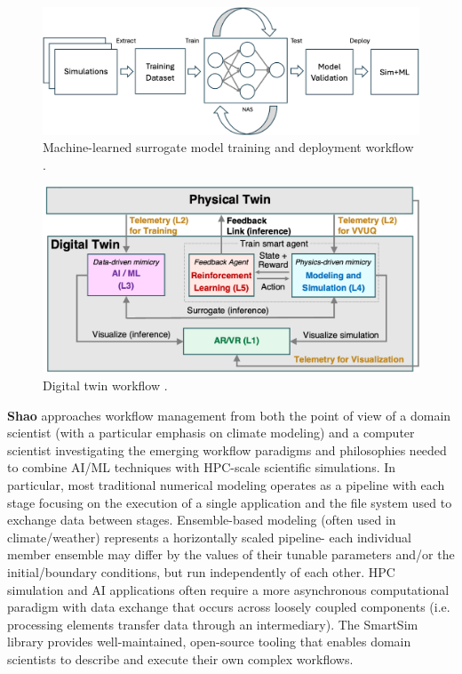 \documentclass[utf8]{FrontiersinVancouver} %
\begin{document}
\begin{figure}
    \centering
    \includegraphics[width=0.8\linewidth]{images/workflow-surrogate-model.png}
    \caption{Machine-learned surrogate model training and deployment workflow \cite{brewer2023entropy}.}
    \label{fig:surrogate}
\end{figure}

\begin{figure}
    \centering
    \includegraphics[width=0.8\linewidth]{images/workflow-digital-twin.png}
    \caption{Digital twin workflow \cite{brewer2024digital}.}
    \label{fig:dt}
\end{figure}


{\bf Shao} approaches workflow management from both the point of view of a domain scientist (with a particular emphasis on climate modeling) and a computer scientist investigating the emerging workflow paradigms and philosophies needed to combine AI/ML techniques with HPC-scale scientific simulations. In particular, most traditional numerical modeling operates as a pipeline with each stage focusing on the execution of a single application and the file system used to exchange data between stages. Ensemble-based modeling (often used in climate/weather) represents a horizontally scaled pipeline- each individual member ensemble may differ by the values of their tunable parameters and/or the initial/boundary conditions, but run independently of each other. HPC simulation and AI applications often require a more asynchronous computational paradigm with data exchange that occurs across loosely coupled components (i.e. processing elements transfer data through an intermediary). The SmartSim library provides well-maintained, open-source tooling that enables domain scientists to describe and execute their own complex workflows.
\end{document}
